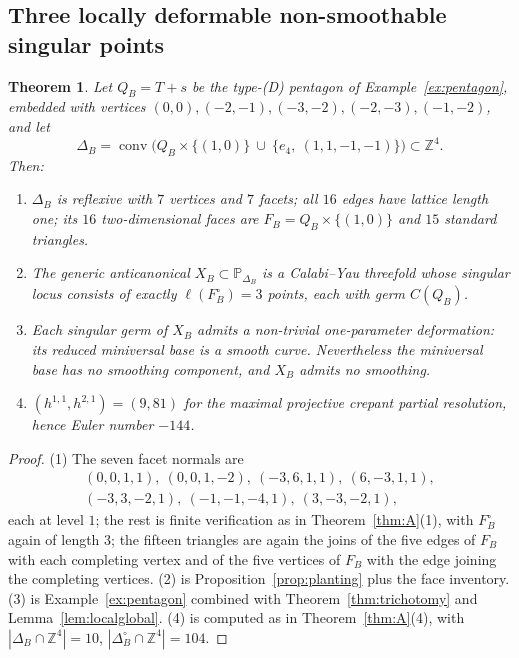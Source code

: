 \documentclass[11pt]{amsart}
\newtheorem{theorem}{Theorem}[section]
\theoremstyle{definition}
\theoremstyle{remark}
\newcommand{\ZZ}{\mathbb{Z}}
\newcommand{\PP}{\mathbb{P}}
\newcommand{\conv}{\operatorname{conv}}
\begin{document}
\subsection{Three locally deformable non-smoothable singular points}

\begin{theorem}\label{thm:B}
Let $Q_B = T + s$ be the type-\textup{(D)} pentagon of
Example~\textup{\ref{ex:pentagon}},
embedded with vertices $(0,0),(-2,-1),(-3,-2),(-2,-3),(-1,-2)$, and let
\[
\Delta_B=\conv\bigl(Q_B\times\{(1,0)\}\ \cup\ \{e_4,\ (1,1,-1,-1)\}\bigr)
\subset \ZZ^4 .
\]
Then:
\begin{enumerate}
\item $\Delta_B$ is reflexive with $7$ vertices and $7$ facets; all $16$ edges
have lattice length one; its $16$ two-dimensional faces are
$F_B = Q_B \times \{(1,0)\}$ and $15$ standard triangles.
\item The generic anticanonical $X_B \subset \PP_{\Delta_B}$ is a Calabi--Yau
threefold whose singular locus consists of exactly $\ell(F_B^\circ)=3$ points,
each with germ $C(Q_B)$.
\item Each singular germ of $X_B$ admits a non-trivial one-parameter
deformation: its reduced miniversal base is a smooth curve.  Nevertheless the
miniversal base has no smoothing component, and $X_B$ admits no smoothing.
\item $(h^{1,1},h^{2,1}) = (9,81)$ for the maximal projective crepant partial
resolution, hence Euler number $-144$.
\end{enumerate}
\end{theorem}

\begin{proof}
(1) The seven facet normals are
\[
\begin{gathered}
(0,0,1,1),\ (0,0,1,-2),\ (-3,6,1,1),\ (6,-3,1,1),\\
(-3,3,-2,1),\ (-1,-1,-4,1),\ (3,-3,-2,1),
\end{gathered}
\]
each at level $1$; the rest is finite verification as in
Theorem~\ref{thm:A}(1), with $F_B^\circ$ again of length $3$; the fifteen
triangles are again the joins of the five edges of $F_B$ with each
completing vertex and of the five vertices of $F_B$ with the edge joining
the completing vertices.
(2) is Proposition~\ref{prop:planting} plus the face inventory.
(3) is Example~\ref{ex:pentagon} combined with
Theorem~\ref{thm:trichotomy} and Lemma~\ref{lem:localglobal}.
(4) is computed as in Theorem~\ref{thm:A}(4), with
$|\Delta_B\cap\ZZ^4|=10$, $|\Delta_B^\circ\cap\ZZ^4|=104$.
\end{proof}
\end{document}
